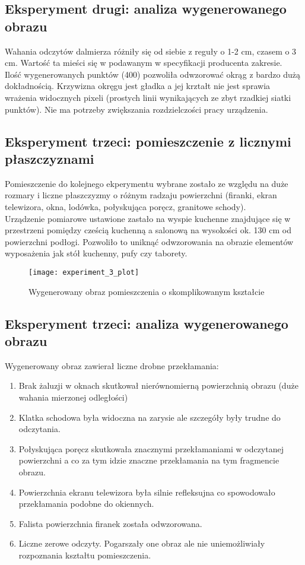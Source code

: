 \subsection {Eksperyment drugi: analiza wygenerowanego obrazu}
Wahania odczytów dalmierza różniły się od siebie z reguły o 1-2 cm, czasem o 3 cm. Wartość ta mieści się w podawanym w specyfikacji producenta zakresie.\\

Ilość wygenerowanych punktów (400) pozwoliła odwzorować okrąg z bardzo dużą dokładnością. Krzywizna okręgu jest gładka a jej krztałt nie jest sprawia wrażenia widocznych pixeli (prostych linii wynikających ze zbyt rzadkiej siatki punktów). Nie ma potrzeby zwiększania rozdzielczości pracy urządzenia.\\

\newpage
\subsection {Eksperyment trzeci: pomieszczenie z licznymi płaszczyznami}
Pomieszczenie do kolejnego ekperymentu wybrane zostało ze względu na duże rozmary i liczne płaszczyzmy o różnym radzaju powierzchni (firanki, ekran telewizora, okna, lodówka, połyskująca poręcz, granitowe schody).\\

Urządzenie pomiarowe ustawione zastało na wyspie kuchenne znajdujące się w przestrzeni pomiędzy cześcią kuchenną a salonową na wysokości ok. 130 cm od powierzchni podłogi. Pozwoliło to uniknąć odwzorowania na obrazie elementów wyposażenia jak stół kuchenny, pufy czy taborety.
\begin{figure}[h]
    \centering
    \texttt{[image: experiment\_3\_plot]}
    \caption{Wygenerowany obraz pomieszczenia o skomplikowanym kształcie}
    \label{fig:experiment_3_plot}
\end{figure}

\newpage
\subsection {Eksperyment trzeci: analiza wygenerowanego obrazu}
Wygenerowany obraz zawierał liczne drobne przekłamania:

\begin{enumerate}
    \item Brak żaluzji w oknach skutkował nierównomierną powierzchnią obrazu (duże wahania mierzonej odległości)
    \item Klatka schodowa była widoczna na zarysie ale szczegóły były trudne do odczytania.
    \item Połyskująca poręcz skutkowała znacznymi przekłamaniami w odczytanej powierzchni a co za tym idzie znaczne przekłamania na tym fragmencie obrazu.
    \item Powierzchnia ekranu telewizora była silnie refleksujna co spowodowało przekłamania podobne do okiennych.
    \item Falista powierzchnia firanek została odwzorowana.
    \item Liczne zerowe odczyty. Pogarszały one obraz ale nie uniemożliwiały rozpoznania kształtu pomieszczenia.
\end{enumerate}

